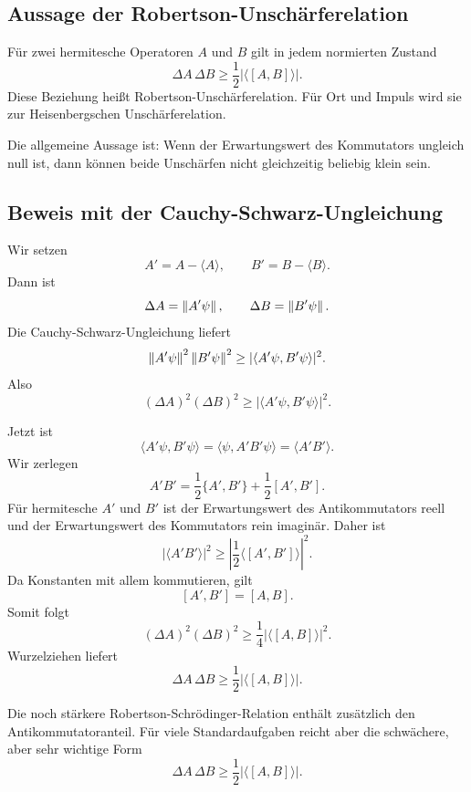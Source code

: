 \subsection{Aussage der Robertson-Unschärferelation}

\begin{formulabox}
Für zwei hermitesche Operatoren $A$ und $B$ gilt in jedem normierten Zustand
\[
    \Delta A\,\Delta B
    \ge
    \frac12\left|\langle[A,B]\rangle\right|.
\]
Diese Beziehung heißt Robertson-Unschärferelation. Für Ort und Impuls wird sie zur Heisenbergschen Unschärferelation.
\end{formulabox}

Die allgemeine Aussage ist: Wenn der Erwartungswert des Kommutators ungleich null ist, dann können beide Unschärfen nicht gleichzeitig beliebig klein sein.

\subsection{Beweis mit der Cauchy-Schwarz-Ungleichung}

Wir setzen
\[
    A'=A-\langle A\rangle,
    \qquad
    B'=B-\langle B\rangle.
\]
Dann ist
\[
    \Delta A=\left\lVert A'\psi \right\rVert,
    \qquad
    \Delta B=\left\lVert B'\psi \right\rVert.
\]
Die Cauchy-Schwarz-Ungleichung liefert
\[
    \left\lVert A'\psi \right\rVert^2\left\lVert B'\psi \right\rVert^2
    \ge
    |\langle A'\psi,B'\psi\rangle|^2.
\]
Also
\[
    (\Delta A)^2(\Delta B)^2
    \ge
    |\langle A'\psi,B'\psi\rangle|^2.
\]

Jetzt ist
\[
    \langle A'\psi,B'\psi\rangle
    =\langle\psi,A'B'\psi\rangle
    =\langle A'B'\rangle.
\]
Wir zerlegen
\[
    A'B'=\frac12\{A',B'\}+\frac12[A',B'].
\]
Für hermitesche $A'$ und $B'$ ist der Erwartungswert des Antikommutators reell und der Erwartungswert des Kommutators rein imaginär. Daher ist
\[
    |\langle A'B'\rangle|^2
    \ge
    \left|\frac12\langle[A',B']\rangle\right|^2.
\]
Da Konstanten mit allem kommutieren, gilt
\[
    [A',B']=[A,B].
\]
Somit folgt
\[
    (\Delta A)^2(\Delta B)^2
    \ge
    \frac14|\langle[A,B]\rangle|^2.
\]
Wurzelziehen liefert
\[
    \Delta A\,\Delta B\ge\frac12|\langle[A,B]\rangle|.
\]

\begin{notebox}
Die noch stärkere Robertson-Schrödinger-Relation enthält zusätzlich den Antikommutatoranteil. Für viele Standardaufgaben reicht aber die schwächere, aber sehr wichtige Form
\[
    \Delta A\,\Delta B\ge\frac12|\langle[A,B]\rangle|.
\]
\end{notebox}

